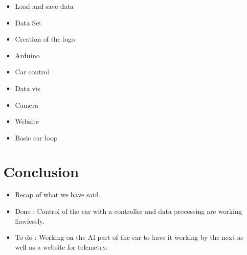 \documentclass[11pt]{article}
\begin{document}
\begin{itemize}

\item Load and save data
\item Data Set
\item Creation of the logo
\item Arduino
\item Car control
\item Data vis
\item Camera
\item Website
\item Basic car loop

\end{itemize}

\section {Conclusion}

\begin{itemize}
\item Recap of what we have said.
\item Done : Control of the car with a controller and data processing are working flawlessly.

\item To do : Working on the AI part of the car to have it working by the next as well as a website for telemetry.
\end{itemize}
\end{document}
